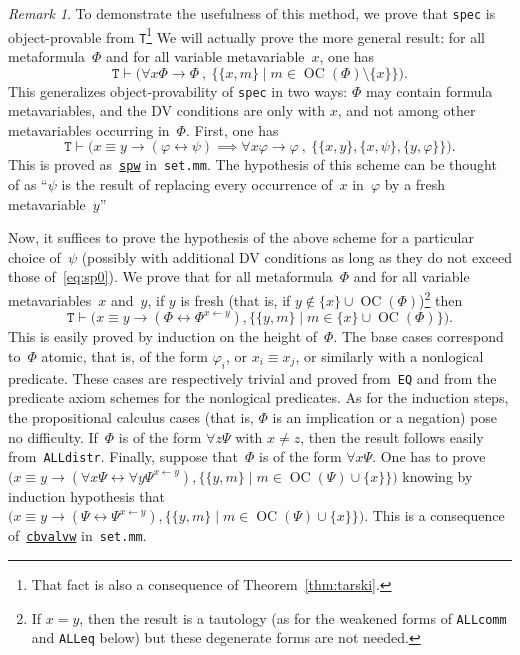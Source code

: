 \documentclass[11pt]{article}
\newcommand*{\rimplies}{\implies}
\newcommand*{\comma}{\:,\:}
\renewcommand*{\phi}{\varphi}
\DeclareMathOperator{\OC}{OC}
\theoremstyle{plain}
\theoremstyle{definition}
\theoremstyle{remark}
\newtheorem{remark}[theorem]{Remark}
\begin{document}
\begin{remark}
To demonstrate the usefulness of this method, we prove that \texttt{spec} is object-provable from
\texttt{T}\footnote{That fact is also a consequence of Theorem~\ref{thm:tarski}.}
We will actually prove the more general result: for all metaformula~$\Phi$ and for all variable
metavariable~$x$, one has
\begin{equation}
\label{eq:sp0}
\texttt{T} \vdash 
\Big(
\forall x \Phi \to \Phi
\comma
\big\{ \{x, m\} \mid m \in \OC(\Phi) \setminus \{x\} \big\}
\Big).
\end{equation}
This generalizes object-provability of \texttt{spec} in two ways: $\Phi$ may contain formula
metavariables, and the DV conditions are only with $x$, and not among other metavariables occurring
in~$\Phi$.
First, one has
\begin{equation}
\texttt{T} \vdash 
\Big(
x \equiv y \to (\phi \leftrightarrow \psi) \rimplies \forall x \phi \to \phi
\comma
\big\{\{x, y\}, \{x, \psi\}, \{y, \phi\}\big\}
\Big).
\end{equation}
This is proved as~\href{https://us.metamath.org/mpeuni/spw.html}{\texttt{spw}} in~\texttt{set.mm}.
The hypothesis of this scheme can be thought of as ``$\psi$ is the result of replacing every
occurrence of~$x$ in~$\phi$ by a fresh metavariable~$y$''

Now, it suffices to prove the hypothesis of the above scheme for a particular choice of~$\psi$
(possibly with additional DV conditions as long as they do not exceed those of~\eqref{eq:sp0}).
We prove that for all metaformula~$\Phi$ and for all variable metavariables~$x$ and~$y$, if $y$ is
fresh (that is, if $y \notin \{ x\} \cup \OC(\Phi)$)\rlap{,}\footnote{If $x = y$, then the result
is a tautology (as for the weakened forms of \texttt{ALLcomm} and \texttt{ALLeq} below) but these
degenerate forms are not needed.} then
\begin{equation}
\texttt{T} \vdash
\Big(
x \equiv y \to (\Phi \leftrightarrow \Phi^{x \leftarrow y}),
\big\{ \{y, m\} \mid m \in \{x\} \cup \OC(\Phi)\big\} 
\Big).
\end{equation}
This is easily proved by induction on the height of~$\Phi$.
The base cases correspond to~$\Phi$ atomic, that is, of the form $\phi_i$, or $x_i \equiv x_j$, or
similarly with a nonlogical predicate.
These cases are respectively trivial and proved from~\texttt{EQ} and from the predicate axiom
schemes for the nonlogical predicates.
As for the induction steps, the propositional calculus cases (that is, $\Phi$ is an implication or
a negation) pose no difficulty.
If~$\Phi$ is of the form $\forall z \Psi$ with $x \neq z$, then the result follows easily
from~\texttt{ALLdistr}.
Finally, suppose that~$\Phi$ is of the form $\forall x \Psi$.
One has to prove
$\big( x \equiv y \to (\forall x \Psi \leftrightarrow \forall y \Psi^{x \leftarrow y}),
\big\{ \{y, m\} \mid m \in \OC(\Psi) \cup \{x\} \big\} 
\big)$ knowing by induction hypothesis that 
$\big( x \equiv y \to (\Psi \leftrightarrow \Psi^{x \leftarrow y}),
\big\{ \{y, m\} \mid m \in \OC(\Psi) \cup \{x\} \big\} 
\big)$.
This is a consequence of~\href{https://us.metamath.org/mpeuni/cbvalvw.html}{\texttt{cbvalvw}}
in~\texttt{set.mm}.


\end{remark}
\end{document}
